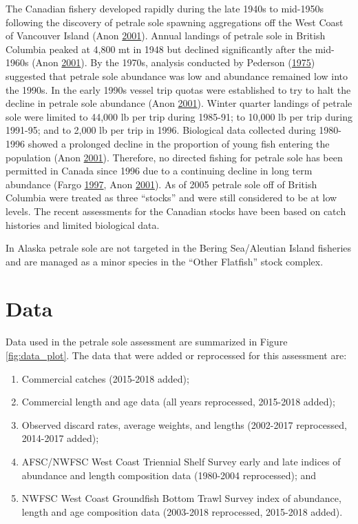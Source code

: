 \documentclass[12pt,]{article}
\begin{document}
The Canadian fishery developed rapidly during the late 1940s to
mid-1950s following the discovery of petrale sole spawning aggregations
off the West Coast of Vancouver Island (Anon
\protect\hyperlink{ref-anon_fish_2001}{2001}). Annual landings of
petrale sole in British Columbia peaked at 4,800 mt in 1948 but declined
significantly after the mid-1960s (Anon
\protect\hyperlink{ref-anon_fish_2001}{2001}). By the 1970s, analysis
conducted by Pederson
(\protect\hyperlink{ref-pedersen_movements_1975}{1975}) suggested that
petrale sole abundance was low and abundance remained low into the
1990s. In the early 1990s vessel trip quotas were established to try to
halt the decline in petrale sole abundance (Anon
\protect\hyperlink{ref-anon_fish_2001}{2001}). Winter quarter landings
of petrale sole were limited to 44,000 lb per trip during 1985-91; to
10,000 lb per trip during 1991-95; and to 2,000 lb per trip in 1996.
Biological data collected during 1980-1996 showed a prolonged decline in
the proportion of young fish entering the population (Anon
\protect\hyperlink{ref-anon_fish_2001}{2001}). Therefore, no directed
fishing for petrale sole has been permitted in Canada since 1996 due to
a continuing decline in long term abundance (Fargo
\protect\hyperlink{ref-fargo_j.j._flatfish_1997}{1997}, Anon
\protect\hyperlink{ref-anon_fish_2001}{2001}). As of 2005 petrale sole
off of British Columbia were treated as three ``stocks'' and were still
considered to be at low levels. The recent assessments for the Canadian
stocks have been based on catch histories and limited biological data.

In Alaska petrale sole are not targeted in the Bering Sea/Aleutian
Island fisheries and are managed as a minor species in the ``Other
Flatfish'' stock complex.

\section{Data}\label{data}

Data used in the petrale sole assessment are summarized in Figure
\ref{fig:data_plot}. The data that were added or reprocessed for this
assessment are:

\begin{enumerate}
  \item Commercial catches (2015-2018 added);
  \item Commercial length and age data (all years reprocessed, 2015-2018 added);
  \item Observed discard rates, average weights, and lengths (2002-2017 reprocessed, 2014-2017 added); 
  \item AFSC/NWFSC West Coast Triennial Shelf Survey early and late indices of abundance and length composition data (1980-2004 reprocessed); and
  \item NWFSC West Coast Groundfish Bottom Trawl Survey index of abundance, length and age composition data (2003-2018 reprocessed, 2015-2018 added).
\end{enumerate}
\end{document}
